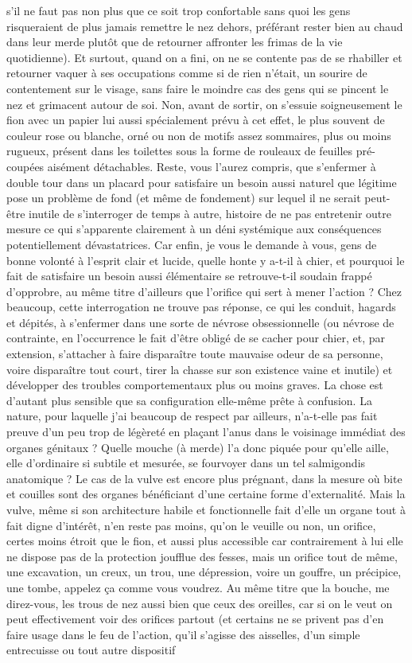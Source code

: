 s’il ne faut pas non plus que ce soit trop confortable sans quoi les gens risqueraient de plus jamais remettre le nez dehors, préférant rester bien au chaud dans leur merde plutôt que de retourner affronter les frimas de la vie quotidienne). Et surtout, quand on a fini, on ne se contente pas de se rhabiller et retourner vaquer à ses occupations comme si de rien n’était, un sourire de contentement sur le visage, sans faire le moindre cas des gens qui se pincent le nez et grimacent autour de soi. Non, avant de sortir, on s’essuie soigneusement le fion avec un papier lui aussi spécialement prévu à cet effet, le plus souvent de couleur rose ou blanche, orné ou non de motifs assez sommaires, plus ou moins rugueux, présent dans les toilettes sous la forme de rouleaux de feuilles pré-coupées aisément détachables. Reste, vous l’aurez compris, que s’enfermer à double tour dans un placard pour satisfaire un besoin aussi naturel que légitime pose un problème de fond (et même de fondement) sur lequel il ne serait peut-être inutile de s’interroger de temps à autre, histoire de ne pas entretenir outre mesure ce qui s’apparente clairement à un déni systémique aux conséquences potentiellement dévastatrices. Car enfin, je vous le demande à vous, gens de bonne volonté à l’esprit clair et lucide, quelle honte y a-t-il à chier, et pourquoi le fait de satisfaire un besoin aussi élémentaire se retrouve-t-il soudain frappé d’opprobre, au même titre d’ailleurs que l’orifice qui sert à mener l’action ? Chez beaucoup, cette interrogation ne trouve pas réponse, ce qui les conduit, hagards et dépités, à s’enfermer dans une sorte de névrose obsessionnelle (ou névrose de contrainte, en l’occurrence le fait d’être obligé de se cacher pour chier, et, par extension, s’attacher à faire disparaître toute mauvaise odeur de sa personne, voire disparaître tout court, tirer la chasse sur son existence vaine et inutile) et développer des troubles comportementaux plus ou moins graves. La chose est d’autant plus sensible que sa configuration elle-même prête à confusion. La nature, pour laquelle j’ai beaucoup de respect par ailleurs, n’a-t-elle pas fait preuve d’un peu trop de légèreté en plaçant l’anus dans le voisinage immédiat des organes génitaux ? Quelle mouche (à merde) l’a donc piquée pour qu’elle aille, elle d’ordinaire si subtile et mesurée, se fourvoyer dans un tel salmigondis anatomique ? Le cas de la vulve est encore plus prégnant, dans la mesure où bite et couilles sont des organes bénéficiant d’une certaine forme d’externalité. Mais la vulve, même si son architecture habile et fonctionnelle fait d’elle un organe tout à fait digne d’intérêt, n’en reste pas moins, qu’on le veuille ou non, un orifice, certes moins étroit que le fion, et aussi plus accessible car contrairement à lui elle ne dispose pas de la protection joufflue des fesses, mais un orifice tout de même, une excavation, un creux, un trou, une dépression, voire un gouffre, un précipice, une tombe, appelez ça comme vous voudrez. Au même titre que la bouche, me direz-vous, les trous de nez aussi bien que ceux des oreilles, car si on le veut on peut effectivement voir des orifices partout (et certains ne se privent pas d’en faire usage dans le feu de l’action, qu’il s’agisse des aisselles, d’un simple entrecuisse ou tout autre dispositif 